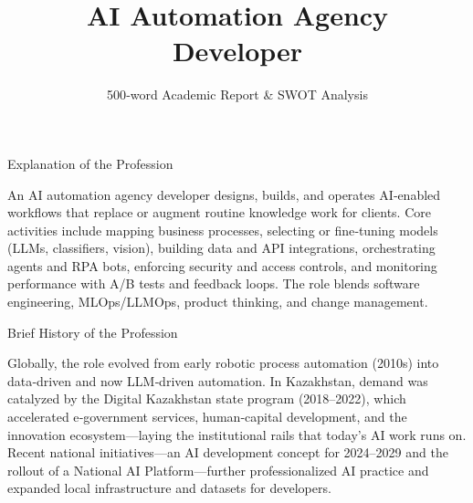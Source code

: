 \documentclass[aspectratio=169,14pt]{beamer}
\title{AI Automation Agency\\Developer}
\subtitle{500‑word Academic Report \& SWOT Analysis}
\begin{document}
\begin{frame}[plain]
  \titlepage
\end{frame}

\begin{frame}{Explanation of the Profession}
  \hspace{1.5cm}%
  \begin{minipage}{0.8\textwidth}
    \large
    An AI automation agency developer designs, builds, and operates AI‑enabled workflows that replace or augment routine knowledge work for clients. Core activities include mapping business processes, selecting or fine‑tuning models (LLMs, classifiers, vision), building data and API integrations, orchestrating agents and RPA bots, enforcing security and access controls, and monitoring performance with A/B tests and feedback loops. The role blends software engineering, MLOps/LLMOps, product thinking, and change management.
  \end{minipage}
\end{frame}

\begin{frame}{Brief History of the Profession}
  \hspace{1.5cm}%
  \begin{minipage}{0.8\textwidth}
    \large
    Globally, the role evolved from early robotic process automation (2010s) into data‑driven and now LLM‑driven automation. In Kazakhstan, demand was catalyzed by the Digital Kazakhstan state program (2018–2022), which accelerated e‑government services, human‑capital development, and the innovation ecosystem—laying the institutional rails that today's AI work runs on. Recent national initiatives—an AI development concept for 2024–2029 and the rollout of a National AI Platform—further professionalized AI practice and expanded local infrastructure and datasets for developers.
  \end{minipage}
\end{frame}
\end{document}
